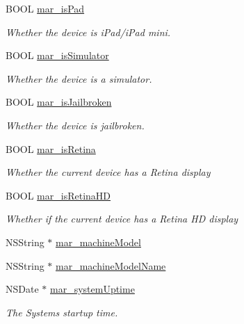  \begin{DoxyCompactItemize}
\item 
B\+O\+OL \hyperlink{category_u_i_device_07_m_a_r_e_x_08_a7f8bea14f45b413d0796a6f39ab90495}{mar\+\_\+is\+Pad}
\begin{DoxyCompactList}\small\item\em Whether the device is i\+Pad/i\+Pad mini. \end{DoxyCompactList}\item 
B\+O\+OL \hyperlink{category_u_i_device_07_m_a_r_e_x_08_a2a1607165bb225351a518d318d3c8282}{mar\+\_\+is\+Simulator}
\begin{DoxyCompactList}\small\item\em Whether the device is a simulator. \end{DoxyCompactList}\item 
B\+O\+OL \hyperlink{category_u_i_device_07_m_a_r_e_x_08_a18eedbaf51c2cde74f250bc3d1091330}{mar\+\_\+is\+Jailbroken}
\begin{DoxyCompactList}\small\item\em Whether the device is jailbroken. \end{DoxyCompactList}\item 
B\+O\+OL \hyperlink{category_u_i_device_07_m_a_r_e_x_08_a2d37e45929ca9d471e097cd27df29f4e}{mar\+\_\+is\+Retina}
\begin{DoxyCompactList}\small\item\em Whether the current device has a Retina display \end{DoxyCompactList}\item 
B\+O\+OL \hyperlink{category_u_i_device_07_m_a_r_e_x_08_aef7beb020b65a1adea4fb832e2379a6c}{mar\+\_\+is\+Retina\+HD}
\begin{DoxyCompactList}\small\item\em Whether if the current device has a Retina HD display \end{DoxyCompactList}\item 
N\+S\+String $\ast$ \hyperlink{category_u_i_device_07_m_a_r_e_x_08_a20be0333f2d3176ea22dc31d61aede81}{mar\+\_\+machine\+Model}
\item 
N\+S\+String $\ast$ \hyperlink{category_u_i_device_07_m_a_r_e_x_08_af489e66589e2d828d94574539dd26b4e}{mar\+\_\+machine\+Model\+Name}
\item 
N\+S\+Date $\ast$ \hyperlink{category_u_i_device_07_m_a_r_e_x_08_a6f50b2cecd74d2b00d7a053620c7c8de}{mar\+\_\+system\+Uptime}
\begin{DoxyCompactList}\small\item\em The System\textquotesingle{}s startup time. \end{DoxyCompactList}\item 

\end{DoxyCompactItemize}
